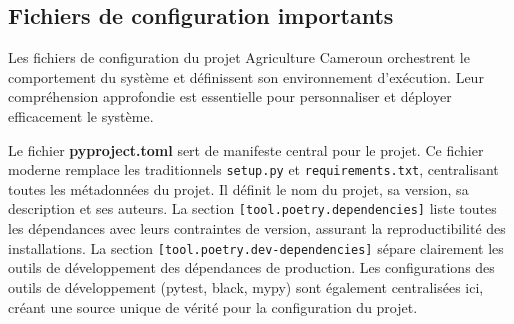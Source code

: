 \subsection{Fichiers de configuration importants}

Les fichiers de configuration du projet Agriculture Cameroun orchestrent le comportement du système et définissent son environnement d'exécution. Leur compréhension approfondie est essentielle pour personnaliser et déployer efficacement le système.

Le fichier \textbf{pyproject.toml} sert de manifeste central pour le projet. Ce fichier moderne remplace les traditionnels \texttt{setup.py} et \texttt{requirements.txt}, centralisant toutes les métadonnées du projet. Il définit le nom du projet, sa version, sa description et ses auteurs. La section \texttt{[tool.poetry.dependencies]} liste toutes les dépendances avec leurs contraintes de version, assurant la reproductibilité des installations. La section \texttt{[tool.poetry.dev-dependencies]} sépare clairement les outils de développement des dépendances de production. Les configurations des outils de développement (pytest, black, mypy) sont également centralisées ici, créant une source unique de vérité pour la configuration du projet.


